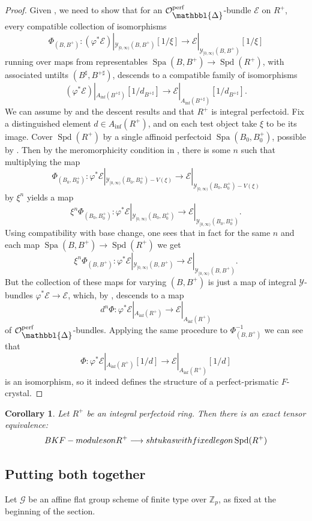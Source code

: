 \documentclass[10pt,twoside]{article}
\numberwithin{equation}{section}
\theoremstyle{plain}
\newtheorem{mycor}[mythm]{Corollary}
\theoremstyle{definition}
\DeclareMathOperator{\Spa}{Spa}
\DeclareMathOperator{\Spd}{Spd}
\newcommand{\ZZ}{\mathbb{Z}}
\newcommand{\MCE}{\mathcal{E}}
\newcommand{\MCG}{\mathcal{G}}
\newcommand{\MCO}{\mathcal{O}}
\newcommand{\MCY}{\mathcal{Y}}
\let \phi \varphi
\DeclareMathOperator{\perf}{perf}
\newcommand{\Prism}{{\mathlarger{\mathbbl{\Delta}}}}
\DeclareMathOperator{\Inf}{inf}
\newcommand{\Ainf}{A_{\Inf}}
\newcommand{\Yco}{\MCY_{[0,\infty)}}
\newcommand{\OpP}{\MCO^{\perf}_{\Prism}}
\begin{document}
\begin{proof}
Given , we need to show that for an \(\OpP\)-bundle \(\MCE\) on \(R^+\), every compatible collection of isomorphisms 
\[\Phi_{(B,B^+)}\colon(\phi^*\MCE)|_{\Yco(B,B^+)}[1/\xi]\longrightarrow \MCE|_{\Yco(B,B^+)}[1/\xi]\]
running over maps from representables \(\Spa(B,B^+)\to \Spd(R^+)\), with associated untilts \((B^\sharp,B^{+\sharp})\), descends to a compatible family of isomorphisms
\[(\phi^*\MCE)|_{\Ainf(B^{+\sharp})}[1/d_{B^{+\sharp}}]\longrightarrow \MCE|_{\Ainf(B^{+\sharp})}[1/d_{B^{+\sharp}}].\]
We can assume by  and the descent results  and  that \(R^+\) is integral perfectoid. Fix a distinguished element \(d\in\Ainf(R^+)\), and on each test object take \(\xi\) to be its image. Cover \(\Spd(R^+)\) by a single affinoid perfectoid \(\Spa(B_0,B_0^+)\), possible by . Then by the meromorphicity condition in , there is some \(n\) such that multiplying the map
\[\Phi_{ (B_0, B_0^+)}\colon\phi^*\MCE|_{\Yco (B_0, B_0^+)-V(\xi)}\longrightarrow \MCE|_{\Yco (B_0, B_0^+)-V(\xi)}\]
by \(\xi^n\) yields a map
\[\xi^n\Phi_{ (B_0, B_0^+)}\colon\phi^*\MCE|_{\Yco (B_0, B_0^+)}\longrightarrow \MCE|_{\Yco (B_0, B_0^+)}.\]
Using compatibility with base change, one sees that in fact for the same \(n\) and each map \(\Spa(B,B^+)\to \Spd(R^+)\) we get
\[\xi^n\Phi_{ (B, B^+)}\colon\phi^*\MCE|_{\Yco (B, B^+)}\longrightarrow \MCE|_{\Yco (B, B^+)}.\]
But the collection of these maps for varying \((B,B^+)\) is just a map of integral \(\MCY\)-bundles \(\phi^*\MCE\to \MCE\), which, by , descends to a map
\[d^n\Phi\colon \phi^*\MCE|_{\Ainf(R^+)}\longrightarrow \MCE|_{\Ainf(R^+)}\]
of \(\OpP\)-bundles. Applying the same procedure to \(\Phi_{(B,B^+)}^{-1}\) we can see that 
\[\Phi\colon \phi^*\MCE|_{\Ainf(R^+)}[1/d]\longrightarrow \MCE|_{\Ainf(R^+)}[1/d]\]
is an isomorphism, so it indeed defines the structure of a perfect-prismatic \(F\)-crystal.
\end{proof}

\begin{mycor}\label{BKFEquivalence}
    Let \(R^+\) be an integral perfectoid ring. Then there is an exact tensor equivalence:
    \[\emph{BKF-modules on }R^+\longrightarrow \emph{shtukas with fixed leg on }\Spd(R^+)\]
\end{mycor}
\subsection{Putting both together}
Let \(\MCG\) be an affine flat group scheme of finite type over \(\ZZ_p\), as fixed at the beginning of the section.
\end{document}
